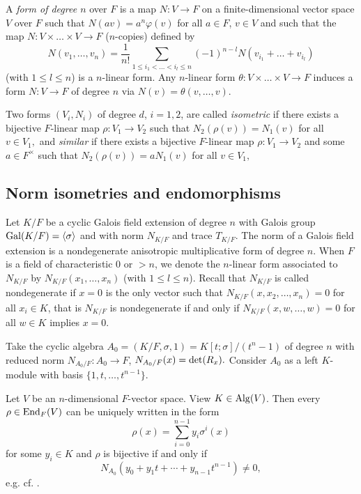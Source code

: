 \documentclass[12pt]{amsart}
\theoremstyle{plain}
\theoremstyle{definition}
\numberwithin{equation}{section}
\numberwithin{figure}{section}
\begin{document}
A {\it form of degree $n$} over $F$ is a map $N:V\to F$  on a finite-dimensional vector space $V$ over $F$
 such that $N(a v)=a^n\varphi(v)$ for all $a\in F$, $v\in V$ and such that the map $N: V \times
\dots \times V \to F$ ($n$-copies) defined by
 $$N(v_1,\dots,v_n)=\frac{1}{n!} \sum_{1\leq i_1< \dots<i_l\leq n}(-1)^{n-l}N(v_{i_1}+ \dots +v_{i_l})$$
(with $1\leq l\leq n$) is a $n$-linear form.
  Any $n$-linear form $\theta : V \times
\dots \times V \to F$ induces a form $N: V\to F$ of degree $n$ via
$N(v)=\theta(v,\dots,v)$.

Two forms $(V_i,N_i)$ of degree $d$, $i=1,2$, are called {\it isometric}
 if there exists a bijective $F$-linear map
$\rho:V_1\to V_2$ such that $N_2(\rho(v))=N_1(v)$ for all $v\in V_1,$ and  {\it similar}  if there exists a bijective $F$-linear map
$\rho:V_1\to V_2$ and some $a\in F^\times$ such that $N_2(\rho(v))=a N_1(v)$ for all $v\in V_1,$


\subsection{Norm isometries and endomorphisms}\label{sec:isometries}
Let $K/F$ be a cyclic Galois field extension of degree $n$ with Galois group  ${\rm Gal}(K/F)=\langle\sigma \rangle$ and with norm $N_{K/F}$ and trace $T_{K/F}$. The norm of a Galois field extension is a  nondegenerate anisotropic multiplicative form of degree $n$.
When $F$ is a field of characteristic 0 or $>n$, we denote  the $n$-linear form associated to $N_{K/F}$ by
$N_{K/F}(x_1,\dots,x_n)$ 
(with $1\leq l\leq n$). Recall that  $N_{K/F}$ is called nondegenerate if
$x = 0$ is the only vector such that $N_{K/F}(x, x_{2}, \dots, x_n) = 0$ for all
 $x_i \in K$, that is $N_{K/F}$ is nondegenerate if and only if $N_{K/F}(x,  w,\dots, w) = 0$ for all
$w\in K$ implies $x=0$.


Take the cyclic algebra  $A_0=(K/F, \sigma, 1)=K[t;\sigma]/(t^n-1)$ of degree $n$ with reduced norm $N_{A_0/F}: A_0 \rightarrow F$,
$N_{A_0/F}(x) = {\rm det}(R_x).$
 Consider $A_0$ as a left $K$-module with basis $\{1,t, \ldots, t^{n-1}\}$.

Let $V$ be an $n$-dimensional $F$-vector space.  View $K\in {\rm Alg}(V)$.
Then every $\rho\in {\rm End}_F(V)$ can be uniquely written in the form
 \begin{equation}\label{iso}
 \rho(x)= \sum_{i=0}^{n-1}y_i\sigma^i(x)
 \end{equation}
 for some $y_i\in K$ and  $\rho$ is bijective  if and only if
 $$N_{A_0}(y_0 + y_1 t + \cdots + y_{n-1}t^{n-1})\not=0,$$
 e.g. cf. \cite[Corollary 2.3]{Pum2025.2}.
\end{document}
